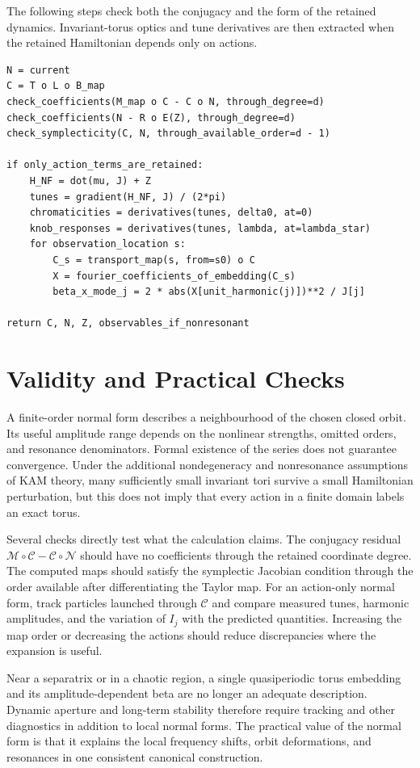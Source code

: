 The following steps check both the conjugacy and the form of the retained
dynamics.  Invariant-torus optics and tune derivatives are then extracted
when the retained Hamiltonian depends only on actions.

\begin{minipage}{\linewidth}
\begin{lstlisting}[basicstyle=\ttfamily\small,columns=fullflexible,
                   keepspaces=true,frame=single]
N = current
C = T o L o B_map
check_coefficients(M_map o C - C o N, through_degree=d)
check_coefficients(N - R o E(Z), through_degree=d)
check_symplecticity(C, N, through_available_order=d - 1)

if only_action_terms_are_retained:
    H_NF = dot(mu, J) + Z
    tunes = gradient(H_NF, J) / (2*pi)
    chromaticities = derivatives(tunes, delta0, at=0)
    knob_responses = derivatives(tunes, lambda, at=lambda_star)
    for observation_location s:
        C_s = transport_map(s, from=s0) o C
        X = fourier_coefficients_of_embedding(C_s)
        beta_x_mode_j = 2 * abs(X[unit_harmonic(j)])**2 / J[j]

return C, N, Z, observables_if_nonresonant
\end{lstlisting}
\end{minipage}



\section{Validity and Practical Checks}

A finite-order normal form describes a neighbourhood of the chosen
closed orbit.  Its useful amplitude range depends on the nonlinear
strengths, omitted orders, and resonance denominators.  Formal existence
of the series does not guarantee convergence.  Under the additional
nondegeneracy and nonresonance assumptions of KAM theory, many sufficiently
small invariant tori survive a small Hamiltonian perturbation, but this
does not imply that every action in a finite domain labels an exact torus.

Several checks directly test what the calculation claims.  The
conjugacy residual $\mathcal M\circ\mathcal C-\mathcal C\circ\mathcal N$
should have no coefficients through the retained coordinate degree.
The computed maps should satisfy the symplectic Jacobian condition
through the order available after differentiating the Taylor map.
For an action-only normal form, track particles launched through
$\mathcal C$ and compare measured tunes, harmonic amplitudes, and the
variation of $I_j$ with the predicted quantities.  Increasing the map
order or decreasing the actions should reduce discrepancies where the
expansion is useful.

Near a separatrix or in a chaotic region, a single quasiperiodic torus
embedding and its amplitude-dependent beta are no longer an adequate
description.  Dynamic aperture and long-term stability therefore require
tracking and other diagnostics in addition to local normal forms.
The practical value of the normal form is that it explains the local
frequency shifts, orbit deformations, and resonances in one consistent
canonical construction.
